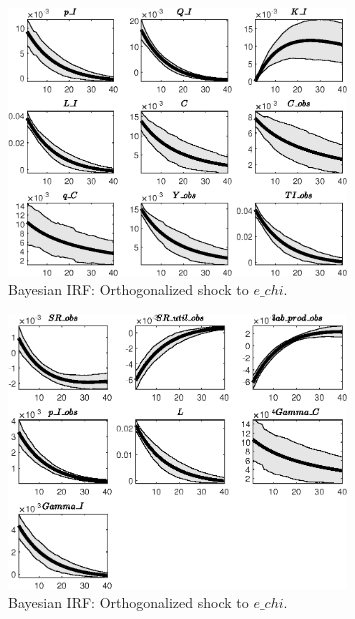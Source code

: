 \begin{figure}[H]
\centering 
\includegraphics[width=0.80\textwidth]{directed_search/Output/directed_search_Bayesian_IRF_e_chi_1}
\caption{Bayesian IRF: Orthogonalized shock to $e\_chi$.}
\label{Fig:BayesianIRF:e_chi:1}
\end{figure}
 
\begin{figure}[H]
\centering 
\includegraphics[width=0.80\textwidth]{directed_search/Output/directed_search_Bayesian_IRF_e_chi_2}
\caption{Bayesian IRF: Orthogonalized shock to $e\_chi$.}
\label{Fig:BayesianIRF:e_chi:2}
\end{figure}
 
